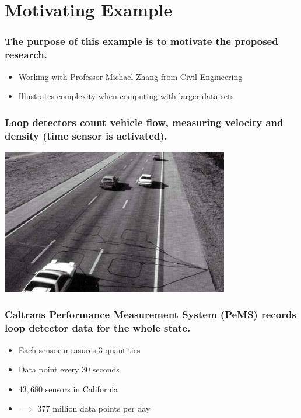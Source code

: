\documentclass{beamer}
\begin{document}
\section{Motivating Example}
\begin{frame}

    \frametitle{The purpose of this example is to motivate the proposed
    research.}

    \begin{itemize}
        \item Working with Professor Michael Zhang from Civil Engineering
        \item Illustrates complexity when computing with larger data sets
    \end{itemize}

\end{frame}
\begin{frame}

    \frametitle{Loop detectors count vehicle flow, measuring velocity and
    density (time sensor is activated).}

\centerline{\includegraphics[height=2.5in]{loop_detector.jpg}}

\end{frame}
\begin{frame}

\frametitle{Caltrans Performance Measurement System (PeMS) records loop
    detector
data for the whole state.}

    \begin{itemize}
        \item Each sensor measures 3 quantities
        \item Data point every 30 seconds
        \item $43,680$ sensors in California
        \item $\implies$  377 million data points per day
    \end{itemize}

\end{frame}
\end{document}

